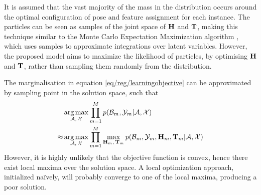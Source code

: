 It is assumed that the vast majority of the mass in the distribution occurs around the optimal configuration of pose and feature assignment for each instance. The particles can be seen as samples of the joint space of $\mathbf{H}$ and $\mathbf{T}$, making this technique similar to the Monte Carlo Expectation Maximization algorithm \cite{Levine2001, Wei1990}, which uses samples to approximate integrations over latent variables. However, the proposed model aims to maximize the likelihood of particles, by optimising $\mathbf{H}$ and $\mathbf{T}$, rather than sampling them randomly from the distribution. 

The marginalisation in equation \ref{eq/reg/learningobjective} can be approximated by sampling point in the solution space, such that 
\begin{equation}
	\begin{aligned}
		& \operatorname*{arg\,max}_{\mathcal{A},\,\mathcal{X}}
		\displaystyle\prod_{m=1}^M
		p(\mathcal{B}_m,\mathcal{Y}_m|\mathcal{A},\mathcal{X}) \\ 
		\approx &  
		\operatorname*{arg\,max}_{\mathcal{A},\,\mathcal{X}}
		\displaystyle\prod_{m=1}^M
		\max_{\mathbf{H}_m,\,\mathbf{T}_m}
		p(\mathcal{B}_m,\mathcal{Y}_m,\mathbf{H}_m,\mathbf{T}_m|\mathcal{A},\mathcal{X})
	\end{aligned}
	\label{eq/reg/approximatemaximumpose}
\end{equation}
However, it is highly unlikely that the objective function is convex, hence there exist local maxima over the solution space. A local optimization approach, initialized na\"{i}vely, will probably converge to one of the local maxima, producing a poor solution. 

